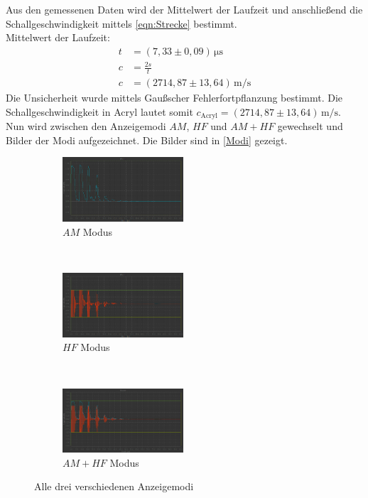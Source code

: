 Aus den gemessenen Daten wird der Mittelwert der Laufzeit und anschließend die Schallgeschwindigkeit mittels \autoref{eqn:Strecke} bestimmt.\\
Mittelwert der Laufzeit:
\begin{align*}
  t &= (7,33 \pm 0,09) \, \si{\micro\second} \\
  c &= \frac{2s}{t} \\
  c &= (2714,87 \pm 13,64) \, \si{\meter\per\second}
\end{align*}
Die Unsicherheit wurde mittels Gaußscher Fehlerfortpflanzung bestimmt. Die Schallgeschwindigkeit in Acryl lautet somit
$c_{\mathrm{Acryl}} = (2714,87 \pm 13,64) \, \si{\meter\per\second}$.\\
Nun wird zwischen den Anzeigemodi $AM$, $HF$ und $AM + HF$ gewechselt und Bilder der Modi aufgezeichnet. Die Bilder sind 
in \autoref{Modi} gezeigt.
\begin{figure}
	\centering
	\begin{subfigure}[b]{0.3\textwidth}
		\centering
		\includegraphics[width=4.5cm]{messwerte/Vorbereitung/Amp.png}
		\caption{$AM$ Modus}
	\end{subfigure}
	~
	\begin{subfigure}[b]{0.3\textwidth}
		\centering
		\includegraphics[width=4.5cm]{messwerte/Vorbereitung/HF.png}
		\caption{$HF$ Modus}
	\end{subfigure}
	~
	\begin{subfigure}[b]{0.3\textwidth}
		\centering
		\includegraphics[width=4.5cm]{messwerte/Vorbereitung/HF+Amp.png}
		\caption{$AM + HF$ Modus}
	\end{subfigure}
  \caption{Alle drei verschiedenen Anzeigemodi}
  \label{Modi}
\end{figure}

